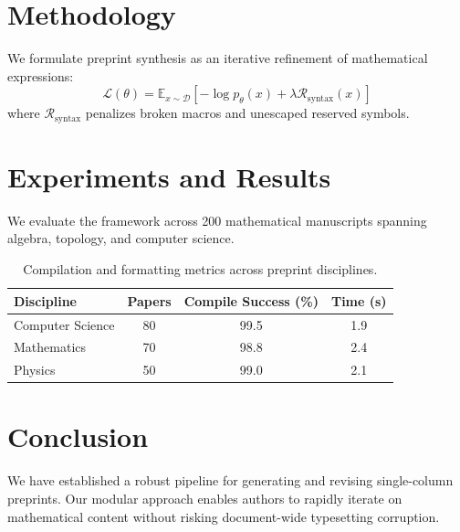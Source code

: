 \documentclass[11pt,a4paper]{article}
\begin{document}
\section{Methodology}
We formulate preprint synthesis as an iterative refinement of mathematical expressions:
\begin{equation}
\mathcal{L}(\theta) = \mathbb{E}_{x \sim \mathcal{D}} \left[ -\log p_\theta(x) + \lambda \mathcal{R}_{\text{syntax}}(x) \right]
\end{equation}
where $\mathcal{R}_{\text{syntax}}$ penalizes broken macros and unescaped reserved symbols.

\section{Experiments and Results}
We evaluate the framework across 200 mathematical manuscripts spanning algebra, topology, and computer science.

\begin{table}[ht]
\centering
\caption{Compilation and formatting metrics across preprint disciplines.}
\label{tab:arxiv_bench}
\begin{tabular}{lccc}
\toprule
\textbf{Discipline} & \textbf{Papers} & \textbf{Compile Success (\%)} & \textbf{Time (s)} \\
\midrule
Computer Science & 80 & 99.5 & 1.9 \\
Mathematics      & 70 & 98.8 & 2.4 \\
Physics          & 50 & 99.0 & 2.1 \\
\bottomrule
\end{tabular}
\end{table}

\section{Conclusion}
We have established a robust pipeline for generating and revising single-column preprints. Our modular approach enables authors to rapidly iterate on mathematical content without risking document-wide typesetting corruption.

\end{document}
